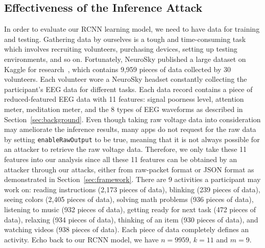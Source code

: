 \subsection{Effectiveness of the Inference Attack}
In order to evaluate our RCNN learning model, we need to have data for training and testing. Gathering data by ourselves is a tough and time-consuming task which involves recruiting volunteers, purchasing devices, setting up testing environments, and so on. Fortunately, NeuroSky published a large dataset on Kaggle for research~\cite{neuroskydata}, which contains 9,959 pieces of data collected by 30 volunteers. Each volunteer wore a NeuroSky headset constantly collecting the participant's EEG data for different tasks. Each data record contains a piece of reduced-featured EEG data with 11 features: signal poorness level, attention meter, meditation meter, and the 8 types of EEG waveforms as described in Section~\ref{sec:background}. Even though taking raw voltage data into consideration may ameliorate the inference results, many apps do not request for the raw data by setting \texttt{enableRawOutput} to be true, meaning that it is not always possible for an attacker to retrieve the raw voltage data. Therefore, we only take these 11 features into our analysis since all these 11 features can be obtained by an attacker through our attacks, either from raw-packet format or JSON format as demonstrated in Section~\ref{sec:framework}. There are 9 activities a participant may work on: reading instructions (2,173 pieces of data), blinking (239 pieces of data), seeing colors (2,405 pieces of data), solving math problems (936 pieces of data), listening to music (932 pieces of data), getting ready for next task (472 pieces of data), relaxing (934 pieces of data), thinking of an item (930 pieces of data), and watching videos (938 pieces of data). Each piece of data completely defines an activity. Echo back to our RCNN model, we have $n=9959$, $k=11$ and $m=9$.\\
%
